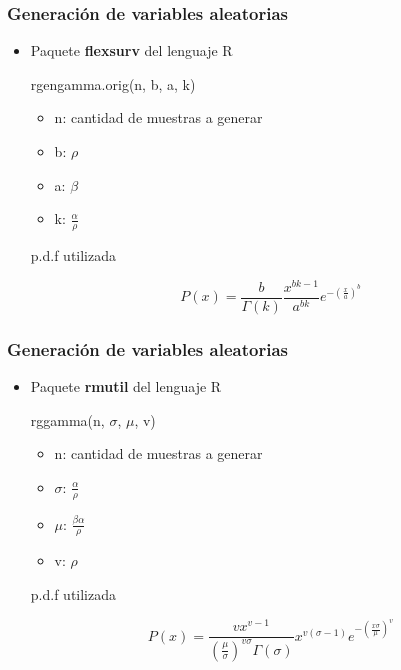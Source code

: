 \begin{frame}
    \frametitle{Generación de variables aleatorias}

    \begin{itemize}
        \item Paquete \textbf{flexsurv} del lenguaje R \cite{flexsurv}

        \vspace{0.5cm}

        rgengamma.orig(n, b, a, k)

        \begin{itemize}
            \item n: cantidad de muestras a generar
            \item b: $\rho$
            \item a: $\beta$
            \item k: $\frac{\alpha}{\rho}$
        \end{itemize}

        \vspace{0.5cm}

        p.d.f utilizada

        \begin{equation*}
            P(x) = \frac{b}{\Gamma (k)} \frac{x^{bk-1}}{a^{bk}} e^{- \left( \frac{x}{a} \right)^b}
        \end{equation*}
    \end{itemize}
\end{frame}

\begin{frame}
    \frametitle{Generación de variables aleatorias}

    \begin{itemize}
        \item Paquete \textbf{rmutil} del lenguaje R \cite{rmutil}

        \vspace{0.5cm}

        rggamma(n, $\sigma$, $\mu$, v)

        \begin{itemize}
            \item n: cantidad de muestras a generar
            \item $\sigma$: $\frac{\alpha}{\rho}$
            \item $\mu$: $\frac{\beta \alpha}{\rho}$
            \item v: $\rho$
        \end{itemize}

        \vspace{0.5cm}

        p.d.f utilizada

        \begin{equation*}
            P(x) = \frac{v x^{v-1}}{\left( \frac{\mu}{\sigma} \right)^{v \sigma} \Gamma (\sigma)} x^{v (\sigma-1)} e^{- \left( \frac{x \sigma}{\mu} \right)^v}
        \end{equation*}
    \end{itemize}
\end{frame}

